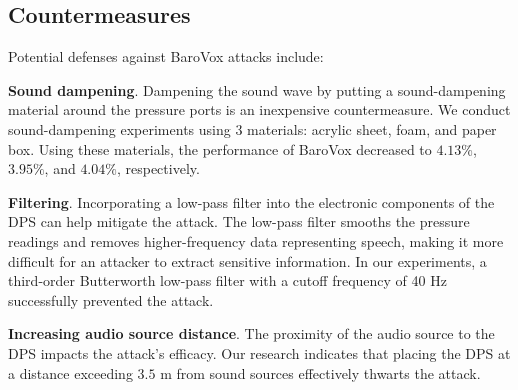 
\subsection{Countermeasures}
Potential defenses against BaroVox attacks include:

{\textbf{Sound dampening}}. Dampening the sound wave by putting a sound-dampening material around the pressure ports is an inexpensive countermeasure. We conduct sound-dampening experiments using 3 materials: acrylic sheet, foam, and paper box. Using these materials, the performance of BaroVox decreased to $4.13\%$, $3.95\%$, and $4.04\%$, respectively. 

 
 
{\textbf{Filtering}}. Incorporating a low-pass filter into the electronic components of the DPS can help mitigate the attack. The low-pass filter smooths the pressure readings and removes higher-frequency data representing speech, making it more difficult for an attacker to extract sensitive information. In our experiments, a third-order Butterworth low-pass filter with a cutoff frequency of 40 Hz successfully prevented the attack.

{\textbf{Increasing audio source distance}}. The proximity of the audio source to the DPS impacts the attack's efficacy. 
Our research indicates that placing the DPS at a distance exceeding $3.5$ m from sound sources effectively thwarts the attack. 

